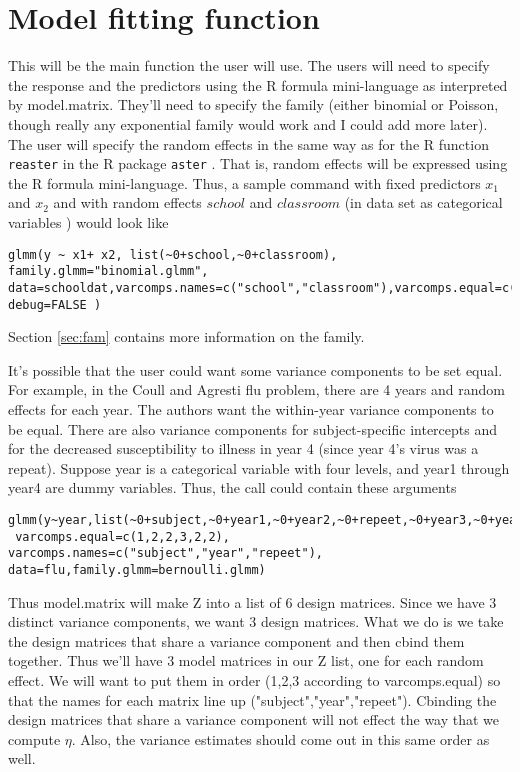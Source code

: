 \documentclass{article}
\begin{document}
\section{Model fitting function} 
This will be the main function the user will use. The users will need to specify the response and the predictors using the R formula mini-language as interpreted by model.matrix. They'll need to specify the  family (either binomial or Poisson, though  really any exponential family would work and I could add more later). The user will specify the random effects in the same way as for the R function \texttt{reaster} in the R package
 \texttt{aster} \citep{aster-package}. That is, random effects will be expressed using the R formula mini-language. Thus, a sample command with fixed predictors $x_1$ and $x_2$ and with random effects $school$ and $classroom$ (in data set as categorical variables ) would look like
\begin{verbatim}
glmm(y ~ x1+ x2, list(~0+school,~0+classroom),  family.glmm="binomial.glmm", 
data=schooldat,varcomps.names=c("school","classroom"),varcomps.equal=c(1,2),
debug=FALSE )
 \end{verbatim} 
Section \ref{sec:fam} contains more information on the family.


It's possible that the user could want some variance components to be set equal. For example, in the Coull and Agresti flu problem, there are 4 years and random effects for each year. The authors want the within-year variance components to be equal.  There are also variance components for subject-specific intercepts and for the decreased susceptibility to illness in year 4 (since year 4's virus was a repeat). Suppose year is a categorical variable with four levels, and year1 through year4 are dummy variables. Thus, the call could contain these arguments
\begin{verbatim}
glmm(y~year,list(~0+subject,~0+year1,~0+year2,~0+repeet,~0+year3,~0+year4),
 varcomps.equal=c(1,2,2,3,2,2), varcomps.names=c("subject","year","repeet"),
data=flu,family.glmm=bernoulli.glmm)
\end{verbatim}

Thus model.matrix will make Z into a list of 6 design matrices. Since we have 3 distinct variance components, we want 3 design matrices. What we do is we take the design matrices that share a variance component and then cbind them together. Thus we'll have 3 model matrices in our Z list, one for each random effect. We will want to put them in order (1,2,3 according to varcomps.equal) so that the names for each matrix line up ("subject","year","repeet").  Cbinding the design matrices that share a variance component will not effect the way that we compute $\eta$.  Also, the variance estimates should come out in this same order as well.
    
\end{document}
